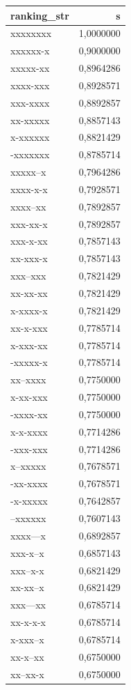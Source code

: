 \documentclass[
  letterpaper,
  DIV=11,
  numbers=noendperiod]{scrreprt}
\begin{document}
\begin{longtable*}{lr}
\toprule
ranking\_str & s \\ 
\midrule\addlinespace[2.5pt]
xxxxxxxx & 1,0000000 \\ 
xxxxxx-x & 0,9000000 \\ 
xxxxx-xx & 0,8964286 \\ 
xxxx-xxx & 0,8928571 \\ 
xxx-xxxx & 0,8892857 \\ 
xx-xxxxx & 0,8857143 \\ 
x-xxxxxx & 0,8821429 \\ 
-xxxxxxx & 0,8785714 \\ 
xxxxx--x & 0,7964286 \\ 
xxxx-x-x & 0,7928571 \\ 
xxxx--xx & 0,7892857 \\ 
xxx-xx-x & 0,7892857 \\ 
xxx-x-xx & 0,7857143 \\ 
xx-xxx-x & 0,7857143 \\ 
xxx--xxx & 0,7821429 \\ 
xx-xx-xx & 0,7821429 \\ 
x-xxxx-x & 0,7821429 \\ 
xx-x-xxx & 0,7785714 \\ 
x-xxx-xx & 0,7785714 \\ 
-xxxxx-x & 0,7785714 \\ 
xx--xxxx & 0,7750000 \\ 
x-xx-xxx & 0,7750000 \\ 
-xxxx-xx & 0,7750000 \\ 
x-x-xxxx & 0,7714286 \\ 
-xxx-xxx & 0,7714286 \\ 
x--xxxxx & 0,7678571 \\ 
-xx-xxxx & 0,7678571 \\ 
-x-xxxxx & 0,7642857 \\ 
--xxxxxx & 0,7607143 \\ 
xxxx---x & 0,6892857 \\ 
xxx-x--x & 0,6857143 \\ 
xxx--x-x & 0,6821429 \\ 
xx-xx--x & 0,6821429 \\ 
xxx---xx & 0,6785714 \\ 
xx-x-x-x & 0,6785714 \\ 
x-xxx--x & 0,6785714 \\ 
xx-x--xx & 0,6750000 \\ 
xx--xx-x & 0,6750000 \\ 

\end{longtable*}
\end{document}
